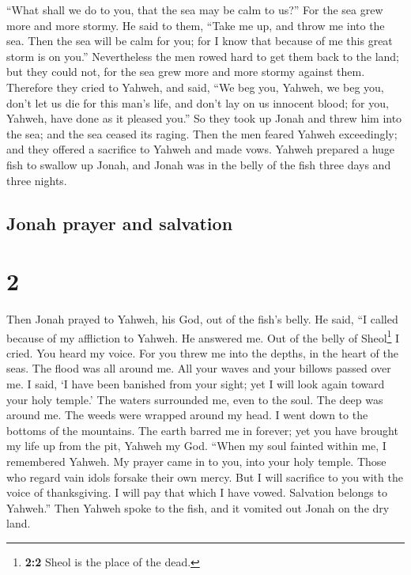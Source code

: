 ``What shall we do to you, that the sea may be calm to us?'' For the sea
grew more and more stormy.  He said to them, ``Take me
up, and throw me into the sea. Then the sea will be calm for you; for I
know that because of me this great storm is on you.'' 
Nevertheless the men rowed hard to get them back to the land; but they
could not, for the sea grew more and more stormy against them.
 Therefore they cried to Yahweh, and said, ``We beg you,
Yahweh, we beg you, don't let us die for this man's life, and don't lay
on us innocent blood; for you, Yahweh, have done as it pleased you.''
 So they took up Jonah and threw him into the sea; and
the sea ceased its raging.  Then the men feared Yahweh
exceedingly; and they offered a sacrifice to Yahweh and made vows.
 Yahweh prepared a huge fish to swallow up Jonah, and
Jonah was in the belly of the fish three days and three nights.

\hypertarget{jonah-prayer-and-salvation}{%
\subsection{Jonah prayer and
salvation}\label{jonah-prayer-and-salvation}}

\hypertarget{section-1}{%
\section{2}\label{section-1}}

 Then Jonah prayed to Yahweh, his God, out of the fish's
belly.  He said, ``I called because of my affliction to
Yahweh. He answered me. Out of the belly of Sheol\footnote{\textbf{2:2}
  Sheol is the place of the dead.} I cried. You heard my voice.
 For you threw me into the depths, in the heart of the
seas. The flood was all around me. All your waves and your billows
passed over me.  I said, `I have been banished from your
sight; yet I will look again toward your holy temple.' 
The waters surrounded me, even to the soul. The deep was around me. The
weeds were wrapped around my head.  I went down to the
bottoms of the mountains. The earth barred me in forever; yet you have
brought my life up from the pit, Yahweh my God.  ``When my
soul fainted within me, I remembered Yahweh. My prayer came in to you,
into your holy temple.  Those who regard vain idols
forsake their own mercy.  But I will sacrifice to you with
the voice of thanksgiving. I will pay that which I have vowed. Salvation
belongs to Yahweh.''  Then Yahweh spoke to the fish, and
it vomited out Jonah on the dry land.

